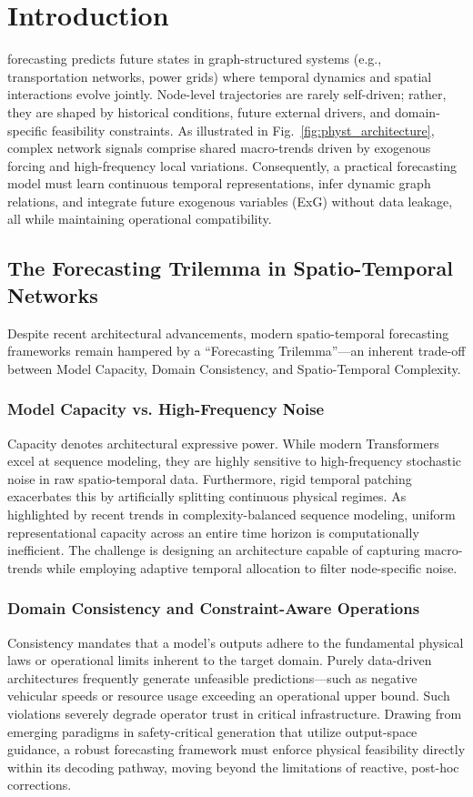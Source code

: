 \section{Introduction}
\label{sec:intro}
 forecasting predicts future states in graph-structured systems (e.g., transportation networks, power grids) where temporal dynamics and spatial interactions evolve jointly. Node-level trajectories are rarely self-driven; rather, they are shaped by historical conditions, future external drivers, and domain-specific feasibility constraints. As illustrated in Fig.~\ref{fig:physt_architecture}, complex network signals comprise shared macro-trends driven by exogenous forcing and high-frequency local variations. Consequently, a practical forecasting model must learn continuous temporal representations, infer dynamic graph relations, and integrate future exogenous variables (ExG) without data leakage, all while maintaining operational compatibility.

\subsection{The Forecasting Trilemma in Spatio-Temporal Networks}
\label{sec:trilemma}
Despite recent architectural advancements, modern spatio-temporal forecasting frameworks remain hampered by a ``Forecasting Trilemma''---an inherent trade-off between Model Capacity, Domain Consistency, and Spatio-Temporal Complexity. 

\subsubsection{Model Capacity vs. High-Frequency Noise}
\label{sec:capacity}
Capacity denotes architectural expressive power. While modern Transformers excel at sequence modeling, they are highly sensitive to high-frequency stochastic noise in raw spatio-temporal data. Furthermore, rigid temporal patching exacerbates this by artificially splitting continuous physical regimes. As highlighted by recent trends in complexity-balanced sequence modeling, uniform representational capacity across an entire time horizon is computationally inefficient. The challenge is designing an architecture capable of capturing macro-trends while employing adaptive temporal allocation to filter node-specific noise.

\subsubsection{Domain Consistency and Constraint-Aware Operations}
\label{sec:consistency}
Consistency mandates that a model's outputs adhere to the fundamental physical laws or operational limits inherent to the target domain. Purely data-driven architectures frequently generate unfeasible predictions---such as negative vehicular speeds or resource usage exceeding an operational upper bound. Such violations severely degrade operator trust in critical infrastructure. Drawing from emerging paradigms in safety-critical generation that utilize output-space guidance, a robust forecasting framework must enforce physical feasibility directly within its decoding pathway, moving beyond the limitations of reactive, post-hoc corrections.

